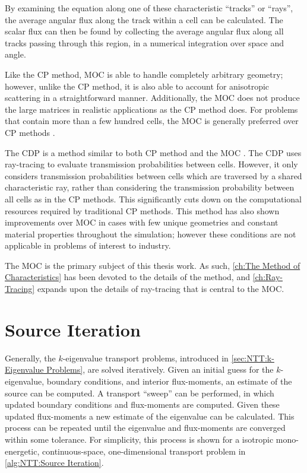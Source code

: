 {{{{                By examining the equation along one of these characteristic ``tracks'' or ``rays'', the average angular flux along the track within a cell can be calculated.
                The scalar flux can then be found by collecting the average angular flux along all tracks passing through this region, in a numerical integration over space and angle.

                Like the \ac{CP} method, \ac{MOC} is able to handle completely arbitrary geometry; however, unlike the \ac{CP} method, it is also able to account for anisotropic scattering in a straightforward manner.
                Additionally, the \ac{MOC} does not produce the large matrices in realistic applications as the \ac{CP} method does.
                For problems that contain more than a few hundred cells, the \ac{MOC} is generally preferred over \ac{CP} methods \cite{Hebert2010}.

                The \ac{CDP} is a method similar to both \ac{CP} method and the \ac{MOC} \cite{Hong1999,Liu2014}.
                The \ac{CDP} uses ray-tracing to evaluate transmission probabilities between cells.
                However, it only considers transmission probabilities between cells which are traversed by a shared characteristic ray, rather than considering the transmission probability between all cells as in the \ac{CP} methods.
                This significantly cuts down on the computational resources required by traditional \ac{CP} methods.
                This method has also shown improvements over \ac{MOC} in cases with few unique geometries and constant material properties throughout the simulation; however these conditions are not applicable in problems of interest to industry.

                The \ac{MOC} is the primary subject of this thesis work.
                As such, \cref{ch:The Method of Characteristics} has been devoted to the details of the method, and \cref{ch:Ray-Tracing} expands upon the details of ray-tracing that is central to the \ac{MOC}.
            }
        }
    }
    \section{Source Iteration}{\label{sec:NTT:Source Iteration}
        Generally, the $k$-eigenvalue transport problems, introduced in \cref{sec:NTT:k-Eigenvalue Problems}, are solved iteratively.
        Given an initial guess for the $k$-eigenvalue, boundary conditions, and interior flux-moments, an estimate of the source can be computed.
        A transport ``sweep'' can be performed, in which updated boundary conditions and flux-moments are computed.
        Given these updated flux-moments a new estimate of the eigenvalue can be calculated.
        This process can be repeated until the eigenvalue and flux-moments are converged within some tolerance.
        For simplicity, this process is shown for a isotropic mono-energetic, continuous-space, one-dimensional transport problem in \cref{alg:NTT:Source Iteration}.

}}
